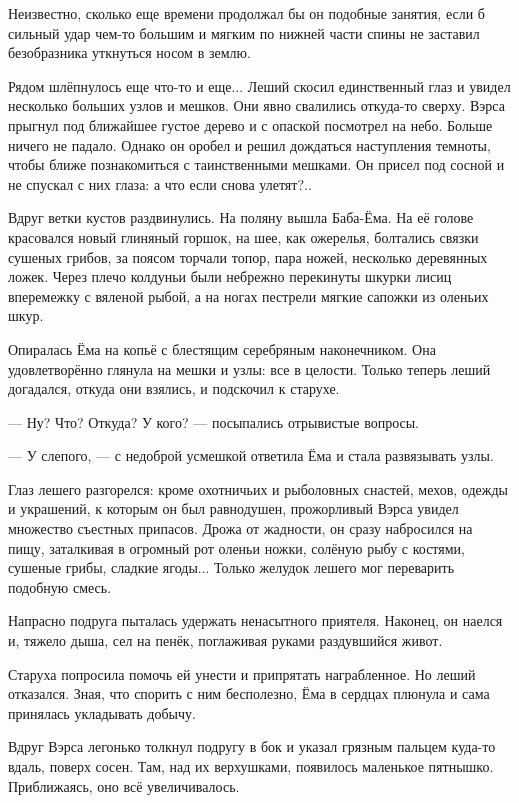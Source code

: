\documentclass[12pt, a4paper, openany]{book}
\begin{document}
	Неизвестно, сколько еще времени продолжал бы он подобные занятия, если б сильный удар чем-то большим и мягким по нижней части спины не заставил безобразника уткнуться носом в землю.
	
	Рядом шлёпнулось еще что-то и еще... Леший скосил единственный глаз и увидел несколько больших узлов и мешков. Они явно свалились откуда-то сверху. Вэрса прыгнул под ближайшее густое дерево и с опаской посмотрел на небо. Больше ничего не падало. Однако он оробел и решил дождаться наступления темноты, чтобы ближе познакомиться с таинственными мешками. Он присел под сосной и не спускал с них глаза: а что если снова улетят?..
	
	Вдруг ветки кустов раздвинулись. На поляну вышла Баба-Ёма. На её голове красовался новый глиняный горшок, на шее, как ожерелья, болтались связки сушеных грибов, за поясом торчали топор, пара ножей, несколько деревянных ложек. Через плечо колдуньи были небрежно перекинуты шкурки лисиц вперемежку с вяленой рыбой, а на ногах пестрели мягкие сапожки из оленьих шкур.
	
	Опиралась Ёма на копьё с блестящим серебряным наконечником. Она удовлетворённо глянула на мешки и узлы: все в целости. Только теперь леший догадался, откуда они взялись, и подскочил к старухе.
	
	— Ну? Что? Откуда? У кого? — посыпались отрывистые вопросы.
	
	— У слепого, — с недоброй усмешкой ответила Ёма и стала развязывать узлы.
	
	Глаз лешего разгорелся: кроме охотничьих и рыболовных снастей, мехов, одежды и украшений, к которым он был равнодушен, прожорливый Вэрса увидел множество съестных припасов. Дрожа от жадности, он сразу набросился на пищу, заталкивая в огромный рот оленьи ножки, солёную рыбу с костями, сушеные грибы, сладкие ягоды... Только желудок лешего мог переварить подобную смесь.
	
	Напрасно подруга пыталась удержать ненасытного приятеля. Наконец, он наелся и, тяжело дыша, сел на пенёк, поглаживая руками раздувшийся живот.
	
	Старуха попросила помочь ей унести и припрятать награбленное. Но леший отказался. Зная, что спорить с ним бесполезно, Ёма в сердцах плюнула и сама принялась укладывать добычу.
	
	Вдруг Вэрса легонько толкнул подругу в бок и указал грязным пальцем куда-то вдаль, поверх сосен. Там, над их верхушками, появилось маленькое пятнышко. Приближаясь, оно всё увеличивалось.
	
\end{document}
